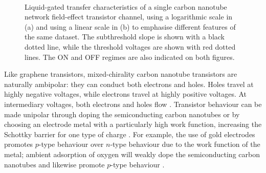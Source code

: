\documentclass[
  a4paper,
]{scrbook}
\begin{document}
\begin{figure}
\begin{minipage}[t]{0.45\linewidth}
{{}

}

\end{minipage}%
%
\begin{minipage}[t]{0.01\linewidth}

{\centering 

~

}

\end{minipage}%

\caption{\label{fig-CNT-characteristics}Liquid-gated transfer
characteristics of a single carbon nanotube network field-effect
transistor channel, using a logarithmic scale in (a) and using a linear
scale in (b) to emphasise different features of the same dataset. The
subthreshold slope is shown with a black dotted line, while the
threshold voltages are shown with red dotted lines. The ON and OFF
regimes are also indicated on both figures.}

\end{figure}

Like graphene transistors, mixed-chirality carbon nanotube transistors
are naturally ambipolar: they can conduct both electrons and holes.
Holes travel at highly negative voltages, while electrons travel at
highly positive voltages. At intermediary voltages, both electrons and
holes flow \autocite{Yao2021}. Transistor behaviour can be made unipolar
through doping the semiconducting carbon nanotubes or by choosing an
electrode metal with a particularly high work function, increasing the
Schottky barrier for one type of charge
\autocite{Avouris2007,Cao2009,Yao2021}. For example, the use of gold
electrodes promotes \(p\)-type behaviour over \(n\)-type behaviour due
to the work function of the metal; ambient adsorption of oxygen will
weakly dope the semiconducting carbon nanotubes and likewise promote
\(p\)-type behaviour \autocite{McEuen2002,Cao2009,Shkodra2021}.
\end{document}
